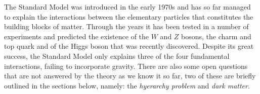 The Standard Model was introduced in the early 1970s and has so far managed to
explain the interactions between the elementary particles that constitutes the
building blocks of matter. Through the years it has been tested in a number of
experiments and predicted the existence of the $W$ and $Z$ bosons, the charm and
top quark and of the Higgs boson that was recently discovered. Despite its great
success, the Standard Model only explains three of the four fundamental
interactions, failing to incorporate gravity. There are also some open questions
that are not answered by the theory as we know it so far, two of these are
briefly outlined in the sections below, namely: the \emph{hyerarchy problem} and
\emph{dark matter}.
